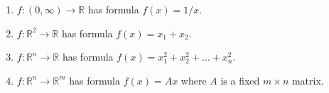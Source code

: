 \documentclass[11pt]{amsart}
\newcommand{\RR}{\mathbb{R}}
\begin{document}
\bigskip
\begin{enumerate}[leftmargin=15pt]
\renewcommand{\labelenumi}{\Large \textbf{\arabic{enumi}.}}
\item $f: (0,\infty) \to \RR$ has formula $f(x) = 1/x$.

\vfill
\item $f: \RR^2 \to \RR$ has formula $f(x) = x_1 + x_2$.

\vfill
\newpage
\item $f: \RR^n \to \RR$ has formula $f(x) = x_1^2 + x_2^2 + \dots + x_n^2$.
\vfill

\item $f: \RR^n \to \RR^m$ has formula $f(x) = A x$ where $A$ is a fixed $m\times n$ matrix.

\vfill
\end{enumerate}
\end{document}
